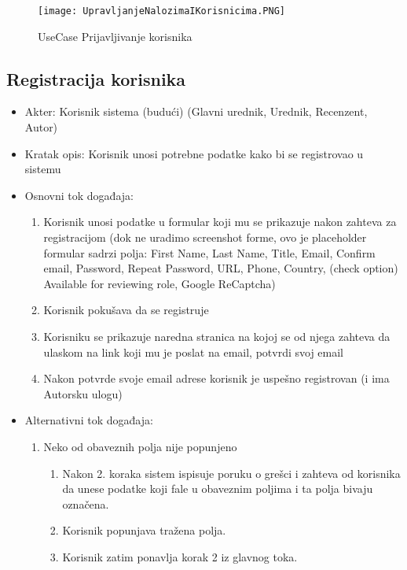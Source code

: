 \documentclass[a4paper]{article}
\begin{document}
\begin{figure}[hbt!]
    \centering
    \texttt{[image: UpravljanjeNalozimaIKorisnicima.PNG]}
    \caption{UseCase Prijavljivanje korisnika}
    \label{fig:my_label}
\end{figure}

\subsection{Registracija korisnika}
\begin{itemize}
    \item Akter: Korisnik sistema (budući) (Glavni urednik, Urednik, Recenzent, Autor)
    \item Kratak opis: Korisnik unosi potrebne podatke kako bi se registrovao u sistemu
    \item Osnovni tok događaja:
        \begin{enumerate}
            \item Korisnik unosi podatke u formular koji mu se prikazuje nakon zahteva za registracijom (dok ne uradimo screenshot forme, ovo je placeholder formular sadrzi polja: First Name, Last Name, Title, Email, Confirm email, Password, Repeat Password, URL, Phone, Country, (check option) Available for reviewing role, Google ReCaptcha)
            \item Korisnik pokušava da se registruje
            \item Korisniku se prikazuje naredna stranica na kojoj se od njega zahteva da ulaskom na link koji mu je poslat na email, potvrdi svoj email
            \item Nakon potvrde svoje email adrese korisnik je uspešno registrovan (i ima Autorsku ulogu)
        \end{enumerate}
    \item Alternativni tok događaja:
        \begin{enumerate}
            \item Neko od obaveznih polja nije popunjeno
                \begin{enumerate}
                    \item Nakon 2. koraka sistem ispisuje poruku o grešci i zahteva od korisnika da unese podatke koji fale u obaveznim poljima i ta polja bivaju označena.
                    \item Korisnik popunjava tražena polja.
                    \item Korisnik zatim ponavlja korak 2 iz glavnog toka.
                \end{enumerate}

\end{enumerate}
\end{itemize}
\end{document}

